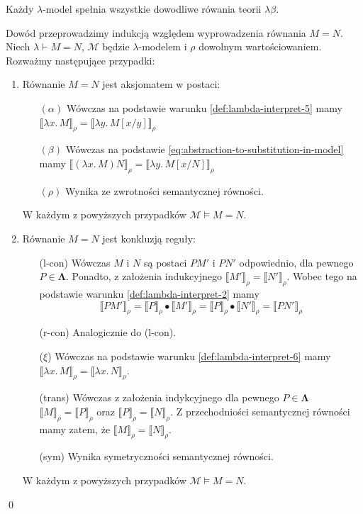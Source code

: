 \begin{twierdzenie}
  Każdy \(\lambda\)-model spełnia wszystkie dowodliwe rówania teorii \(\lambda\beta\).
\end{twierdzenie}
\begin{dowod}
  Dowód przeprowadzimy indukcją względem wyprowadzenia równania \(M=N\).
  Niech \(\lambda \vdash M=N\), \(\mathcal{M}\) będzie \(\lambda\)-modelem i \(\rho\) dowolnym wartościowaniem.
  Rozważmy następujące przypadki:
  \begin{enumerate}
    \setlength\itemsep{0em}
    \item Równanie \(M=N\) jest aksjomatem w postaci:  
      \begin{enumerate}
      \setlength\itemsep{0em}
        \item[\((\alpha)\)] Wówczas na podstawie warunku \ref{def:lambda-interpret-5} mamy
      \(\llbracket\lambda x.\,M\rrbracket_\rho = \llbracket \lambda y.\,M[x/y]\rrbracket_\rho\) 
        \item[\((\beta)\)] Wówczas na podstawie \eqref{eq:abstraction-to-substitution-in-model} mamy
          \(\llbracket(\lambda x.\,M)N\rrbracket_\rho = \llbracket \lambda y.\,M[x/N]\rrbracket_\rho\) 
       \item[\((\rho)\)] Wynika ze zwrotności semantycznej równości.
      \end{enumerate}    
      W każdym z powyższych przypadków \(\mathcal{M}\models M=N\).
    \item Równanie \(M=N\) jest konkluzją reguły:
      \begin{enumerate}
      \setlength\itemsep{0em}
        \item[(l-con)] Wówczas \(M\) i \(N\) są postaci \(PM'\) i \(PN'\) odpowiednio, dla pewnego \(P\in\mathbf{\Lambda}\).
          Ponadto, z założenia indukcyjnego \(\llbracket M' \rrbracket_\rho=\llbracket N' \rrbracket_\rho\).
          Wobec tego na podstawie warunku \ref{def:lambda-interpret-2} mamy
          \[\llbracket PM'\rrbracket_\rho  =
            \llbracket P\rrbracket_\rho \bullet \llbracket M'\rrbracket_\rho =
            \llbracket P\rrbracket_\rho \bullet \llbracket N'\rrbracket_\rho =
            \llbracket PN'\rrbracket_\rho\]
        \item[(r-con)] Analogicznie do (l-con).
        \item[(\(\xi\))] Wówczas na podstawie warunku \ref{def:lambda-interpret-6} mamy
          \(\llbracket \lambda x.\,M \rrbracket_\rho=\llbracket \lambda x.\,N\rrbracket_\rho\).
        \item[(trans)]
          Wówczas z założenia indykcyjnego dla pewnego \(P\in\mathbf{\Lambda}\)
          \(\llbracket M \rrbracket_\rho = \llbracket P \rrbracket_\rho\) oraz
          \(\llbracket P \rrbracket_\rho=\llbracket N \rrbracket_\rho\).
          Z przechodniości semantycznej równości mamy zatem, że \( \llbracket M \rrbracket_\rho=\llbracket N \rrbracket_\rho\).
        \item[(sym)] Wynika symetryczności semantycznej równości.
      \end{enumerate}
    W każdym z powyższych przypadków \(\mathcal{M}\models M=N\).
  \end{enumerate}
  \qed
\end{dowod}
  
